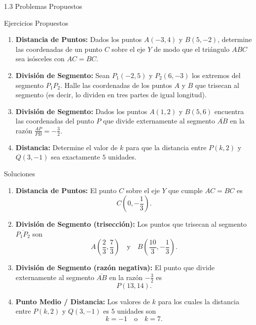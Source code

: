 \documentclass[10pt,aspectratio=169,spanish]{beamer}
\begin{document}
\begin{frame}{1.3 Problemas Propuestos}
\begin{block}{Ejercicios Propuestos}
\begin{enumerate}
    \item \textbf{Distancia de Puntos:} Dados los puntos $A(-3, 4)$ y $B(5, -2)$, determine las coordenadas de un punto $C$ sobre el eje $Y$ de modo que el triángulo $ABC$ sea isósceles con $AC = BC$.
    \item \textbf{División de Segmento:} Sean $P_1(-2, 5)$ y $P_2(6, -3)$ los extremos del segmento $P_1P_2$. Halle las coordenadas de los puntos $A$ y $B$ que trisecan al segmento (es decir, lo dividen en tres partes de igual longitud).

      \item \textbf{División de Segmento:} Dados los puntos
$A(1,2)$ y $B(5,6)$
encuentra las coordenadas del punto \(P\) que divide externamente al segmento \(\overline{AB}\) en la razón
$
\frac{AP}{PB} = -\frac{3}{2}.
$



    \item \textbf{Distancia:} Determine el valor de $k$ para que la distancia entre $P(k, 2)$ y $Q(3, -1)$ sea exactamente $5$ unidades.
\end{enumerate}
\end{block}
\end{frame}


\begin{frame}{Soluciones}
\begin{enumerate}
    \item \textbf{Distancia de Puntos:} El punto $C$ sobre el eje $Y$ que cumple $AC = BC$ es
    \[
    \boxed{C\left(0, -\frac{1}{3}\right)}.
    \]

    \item \textbf{División de Segmento (trisección):} Los puntos que trisecan al segmento $\overline{P_1P_2}$ son
    \[
    \boxed{A\left(\frac{2}{3}, \frac{7}{3}\right)} \quad \text{y} \quad \boxed{B\left(\frac{10}{3}, -\frac{1}{3}\right)}.
    \]

    \item \textbf{División de Segmento (razón negativa):} El punto que divide externamente al segmento $\overline{AB}$ en la razón $-\frac{3}{2}$ es
    \[
    \boxed{P(13, 14)}.
    \]

    \item \textbf{Punto Medio / Distancia:} Los valores de $k$ para los cuales la distancia entre $P(k,2)$ y $Q(3,-1)$ es $5$ unidades son
    \[
    \boxed{k = -1 \quad \text{o} \quad k = 7}.
    \]
\end{enumerate}
\end{frame}
\end{document}
